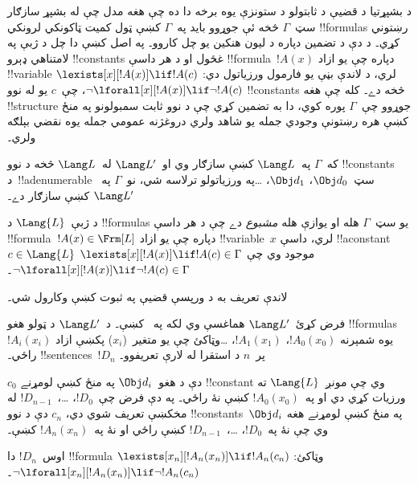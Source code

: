 \documentclass[../../../include/open-logic-section]{subfiles}
\begin{document}


\begin{explain}
د بشپړتيا د قضيې د ثابتولو د ستونزې يوه برخه دا ده چې هغه مدل چې
له بشپړ سازګار سټ~$\Gamma$ څخه ئې جوړوو بايد په~$\Gamma$ کښې ټول
کميت ټاکونکي لرونکي !!{formula}s رښتوني کړي۔ د دې د تضمين دپاره د
ليون هنکين يو چل کاروو۔ په اصل کښې دا چل د ژبې په لامتناهي ډېرو
!!{constant}s غځول او د هر داسې !!{formula}~$!A(x)$ دپاره چې يو
ازاد !!{variable} لري، د لاندې بڼې يو فارمول ورزياتول دي:
      {$\lexists[x][!A(x)] \lif !A(c)$}
      {$\lnot\lforall[x][!A(x)] \lif \lnot !A(c)$}،
چې~$c$ يو له نوو !!{constant}s څخه دے۔ کله چې هغه !!{structure}
جوړوو چې~$\Gamma$ پوره کوي، دا به تضمين کړي چې د نوو ثابت سمبولونو
په منځ کښې هره
{رښتونې وجودي جمله يو شاهد ولري}
{دروغژنه عمومي جمله يوه نقضي بېلګه ولري}۔
\end{explain}

\begin{prop}
که~$\Gamma$ په~$\Lang L$ کښې سازګار وي او~$\Lang L'$ له~$\Lang L$
څخه د نوو !!{constant}s د~!!a{denumerable} سټ~$\Obj d_0$،
$\Obj d_1$، \dots په ورزياتولو ترلاسه شي، نو~$\Gamma$ په~$\Lang L'$
کښې سازګار دے۔
\end{prop}

\begin{defn}[مشبوع سټ]
د ژبې~$\Lang {L}$ د !!{formula}s يو سټ~$\Gamma$ هله او يوازې هله
\emph{مشبوع} دے چې د هر داسې !!{formula}~$!A(x) \in \Frm[L]$
دپاره چې يو ازاد !!{variable}~$x$ لري، داسې !!a{constant}
$c \in \Lang{L}$ موجود وي چې
      {$\lexists[x][!A(x)] \lif !A(c) \in \Gamma$}
      {$\lnot\lforall[x][!A(x)] \lif \lnot !A(c) \in \Gamma$}۔
\end{defn}

لاندې تعريف به د ورپسې قضيې په ثبوت کښې وکارول شي۔

\begin{defn}
فرض کړئ~$\Lang L'$ هماغسې وي لکه په~ کښې۔
د~$\Lang L'$ د ټولو هغو !!{formula}s~$!A_i(x_i)$ يوه شمېرنه
$!A_0(x_0)$، $!A_1(x_1)$، \dots وټاکئ چې يو متغير~($x_i$) پکښې
ازاد راځي۔ !!{sentence}s~$!D_n$ پر~$n$ د استقرا له لارې تعريفوو۔

$c_0$ دې د هغو~$\Obj d_i$ په منځ کښې لومړنے !!{constant} وي چې
مونږ~$\Lang{L}$ ته ورزيات کړي دي او په~$!A_0(x_0)$ کښې نۀ راځي۔
په دې فرض چې~$!D_0$، \dots،~$!D_{n-1}$ له مخکښې تعريف شوي دي،
$c_n$ دې د نوو !!{constant}s~$\Obj d_i$ په منځ کښې لومړنے هغه وي
چې نۀ په~$!D_0$، \dots،~$!D_{n-1}$ کښې راځي او نۀ په~$!A_n(x_n)$
کښې۔

اوس~$!D_{n}$ دا !!{formula} وټاکئ: 
{$\lexists[x_{n}][!A_{n}(x_{n})] \lif
  !A_{n}(c_{n})$}{$\lnot\lforall[x_{n}][!A_{n}(x_{n})] \lif \lnot
  !A_{n}(c_{n})$}۔
\end{defn}
\end{document}
